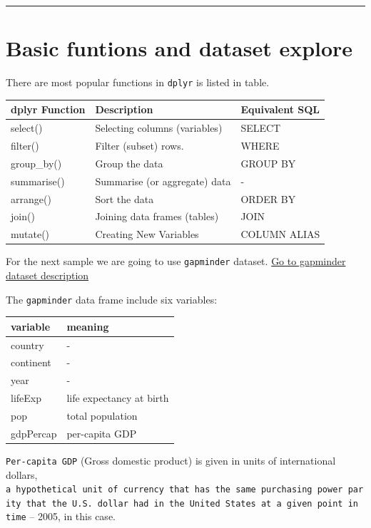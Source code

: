 \documentclass[
  letterpaper,
  DIV=11,
  numbers=noendperiod]{scrreprt}
\begin{document}
\begin{center}\rule{0.5\linewidth}{0.5pt}\end{center}

\section{Basic funtions and dataset
explore}\label{basic-funtions-and-dataset-explore}

There are most popular functions in \texttt{dplyr} is listed in table.

\begin{longtable}[]{@{}lll@{}}
\toprule\noalign{}
dplyr Function & Description & Equivalent SQL \\
\midrule\noalign{}
\endhead
\bottomrule\noalign{}
\endlastfoot
select() & Selecting columns (variables) & SELECT \\
filter() & Filter (subset) rows. & WHERE \\
group\_by() & Group the data & GROUP BY \\
summarise() & Summarise (or aggregate) data & - \\
arrange() & Sort the data & ORDER BY \\
join() & Joining data frames (tables) & JOIN \\
mutate() & Creating New Variables & COLUMN ALIAS \\
\end{longtable}

For the next sample we are going to use \texttt{gapminder} dataset.
\hyperref[gapminder]{Go to gapminder dataset description}

The \texttt{gapminder} data frame include six variables:

\begin{longtable}[]{@{}ll@{}}
\toprule\noalign{}
variable & meaning \\
\midrule\noalign{}
\endhead
\bottomrule\noalign{}
\endlastfoot
country & - \\
continent & - \\
year & - \\
lifeExp & life expectancy at birth \\
pop & total population \\
gdpPercap & per-capita GDP \\
\end{longtable}

\texttt{Per-capita\ GDP} (Gross domestic product) is given in units of
international dollars,
\texttt{a\ hypothetical\ unit\ of\ currency\ that\ has\ the\ same\ purchasing\ power\ parity\ that\ the\ U.S.\ dollar\ had\ in\ the\ United\ States\ at\ a\ given\ point\ in\ time}
-- 2005, in this case.
\end{document}
